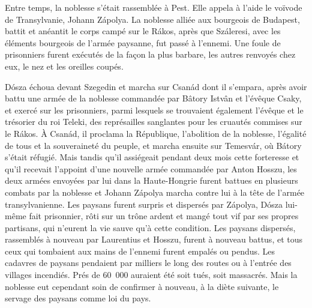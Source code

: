 \documentclass[french,twoside]{book} %
\begin{document}
Entre temps, la noblesse s’était rassemblée à Pest. Elle appela à l’aide le voïvode de Transylvanie, Johann Zápolya. La noblesse alliée aux bourgeois de Budapest, battit et anéantit le corps campé sur le Rákos, après que Száleresi, avec les éléments bourgeois de l’armée paysanne, fut passé à l’ennemi. Une foule de prisonniers furent exécutés de la façon la plus barbare, les autres renvoyés chez eux, le nez et les oreilles coupés.\par
Dósza échoua devant Szegedin et marcha sur Csanád dont il s’empara, après avoir battu une armée de la noblesse commandée par Bâtory Istvân et l’évêque Csaky, et exercé sur les prisonniers, parmi lesquels se trouvaient également l’évêque et le trésorier du roi Teleki, des représailles sanglantes pour les cruautés commises sur le Rákos. À Csanád, il proclama la République, l’abolition de la noblesse, l’égalité de tous et la souveraineté du peuple, et marcha ensuite sur Temesvár, où Bátory s’était réfugié. Mais tandis qu’il assiégeait pendant deux mois cette forteresse et qu’il recevait l’appoint d’une nouvelle armée commandée par Anton Hosszu, les deux armées envoyées par lui dans la Haute-Hongrie furent battues en plusieurs combats par la noblesse et Johann Zápolya marcha contre lui à la tête de l’armée transylvanienne. Les paysans furent surpris et dispersés par Zápolya, Dósza lui-même fait prisonnier, rôti sur un trône ardent et mangé tout vif par ses propres partisans, qui n’eurent la vie sauve qu’à cette condition. Les paysans dispersés, rassemblés à nouveau par Laurentius et Hosszu, furent à nouveau battus, et tous ceux qui tombaient aux mains de l’ennemi furent empalés ou pendus. Les cadavres de paysans pendaient par milliers le long des routes ou à l’entrée des villages incendiés. Prés de 60 000 auraient été soit tués, soit massacrés. Mais la noblesse eut cependant soin de confirmer à nouveau, à la diète suivante, le servage des paysans comme loi du pays.\par
\end{document}
